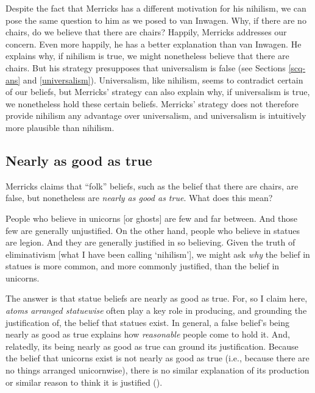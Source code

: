 \documentclass[12pt,twoside]{reedfancy}
\newenvironment{squote}{%
	\begin{spacing}{1}
	\begin{list}{}{%
	\setlength{\labelwidth}{0pt}%
	\rightmargin\leftmargin%
	}
	\item\relax
	}{%
	\end{list}%
	\end{spacing}
	}
\begin{document}
\begin{spacing}{1.25}
Despite the fact that Merricks has a different motivation for his
nihilism, we can pose the same question to him as we posed to van
Inwagen.  Why, if there are no chairs, do we believe that there are
chairs?  Happily, Merricks addresses our concern.  Even more happily,
he has a better explanation than van Inwagen.  He explains why, if
nihilism is true, we might nonetheless believe that there are chairs.
But his strategy presupposes that universalism is false (see Sections
\ref{scq-ans} and \ref{universalism}).  Universalism, like nihilism,
seems to contradict certain of our beliefs, but Merricks' strategy can
also explain why, if universalism is true, we nonetheless hold these
certain beliefs.  Merricks' strategy does not therefore provide
nihilism any advantage over universalism, and universalism is
intuitively more plausible than nihilism.

\subsection{Nearly as good as true}
\label{near}
Merricks claims that ``folk'' beliefs, such as the belief that there
are chairs, are false, but nonetheless are {\em nearly as good as
  true}.  What does this mean?

\begin{squote}
People who believe in unicorns [or ghosts] are few and far between.
And those few are generally unjustified.  On the other hand, people
who believe in statues are legion.  And they are generally justified
in so believing.  Given the truth of eliminativism [what I have been
  calling `nihilism'], we might ask {\em why} the belief in statues is
more common, and more commonly justified, than the belief in unicorns.

The answer is that statue beliefs are nearly as good as true.  For, so
I claim here, {\em atoms arranged statuewise} often play a key role in
producing, and grounding the justification of, the belief that statues
exist.  In general, a false belief's being nearly as good as true
explains how {\em reasonable} people come to hold it.  And, relatedly,
its being nearly as good as true can ground its justification.
Because the belief that unicorns exist is not nearly as good as true
(i.e., because there are no things arranged unicornwise), there is no
similar explanation of its production or similar reason to think it is
justified (\citeyear[171--172]{merricks2001a}).
\end{squote}


\end{spacing}
\end{document}
